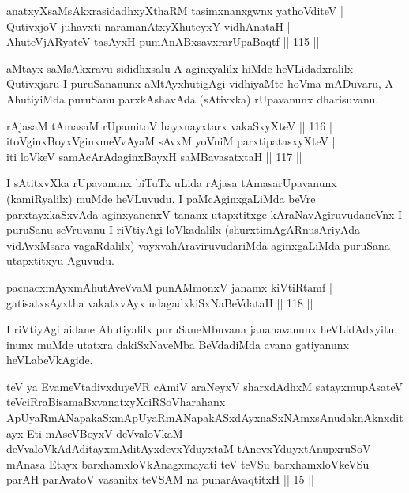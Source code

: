 \begin{shl}
anatxyXsaMsAkxrasidadhxyXthaRM tasimxnanxgwnx yathoVditeV | \\
QutivxjoV juhavxti naramanAtxyXhuteyxY vidhAnataH | \\
AhuteVjARyateV tasAyxH pumAnABxsavxrarUpaBaqtf \hfill|| 115 || 
\end{shl}

\begin{artha}
aMtayx saMsAkxravu sididhxsalu A aginxyalilx hiMde heVLidadxralilx
Qutivxjaru I puruSananunx aMtAyxhutigAgi vidhiyaMte hoVma mADuvaru, A
AhutiyiMda puruSanu parxkAshavAda (sAtivxka) rUpavanunx dharisuvanu.
\end{artha}

\begin{shl}
rAjasaM tAmasaM rUpamitoV hayxnayxtarx vakaSxyXteV \hfill|| 116 | \\
itoV\s ginxBoyxV\s ginxmeVvAyaM sAvxM yoVniM parxtipatasxyXteV | \\
iti loVkeV samAcArAdaginxBayxH saMBavasatxtaH \hfill|| 117 || 
\end{shl}

\begin{artha}
I sAtitxvXka rUpavanunx biTuTx uLida rAjasa tAmasarUpavanunx
(kamiRyalilx) muMde heVLuvudu. I paMcAginxgaLiMda beVre
parxtayxkaSxvAda aginxyanenxV tananx utapxtitxge kAraNavAgiruvudaneVnx I
puruSanu seVruvanu I riVtiyAgi loVkadalilx (shurxtimAgARnusAriyAda
vidAvxMsara vagaRdalilx) vayxvahAraviruvudariMda aginxgaLiMda puruSana
utapxtitxyu Aguvudu.
\end{artha}


\begin{shl}
pacnacxmAyxmAhutAveVvaM punAMmonxV janamx kiVtiRtamf | \\
gatisatxsAyxtha vakatxvAyx udagadxkiSxNaBeVdataH \hfill|| 118 || 
\end{shl}

\begin{artha}
I riVtiyAgi aidane Ahutiyalilx puruSaneMbuvana jananavanunx
heVLi\-dAdxyitu, inunx muMde utatxra dakiSxNaveMba BeVdadiMda avana
gatiyanunx heVLabeVkAgide.
\end{artha}

\begin{shl}
teV ya EvameVtadivxduyeVR cAmiV araNeyxV sharxdAdhxM satayxmupAsateV teV\s ciRraBisamaBxvanatxyXciRSoV\s harahanx ApUyaRmANapakaSxmApUyaRmANapakASxdAyxnaSxNAmxsAnudaknAknxditayx Eti mAseVBoyxV deVvaloVkaM deVvaloVkAdAditayxmAditAyxdevxYduyxtaM tAnevxYduyxtAnupxruSoV mAnasa Etayx barxhamxloVkAnagxmayati teV teVSu barxhamxloVkeVSu parAH parAvatoV vasanitx teVSAM na punarAvaqtitxH || 15 ||
\end{shl}

